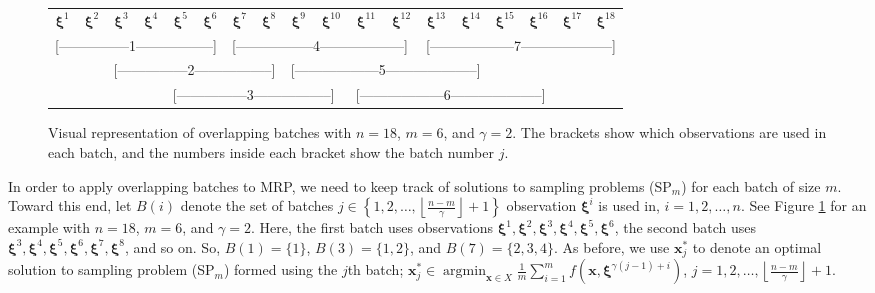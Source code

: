 \documentclass[12pt]{article}
\newcommand{\x}{\mathbf{x}}
\newcommand{\xs}{\x^*}
\newcommand{\xit}{\boldsymbol{\xi}}
\newcommand{\xiti}{\xit^i}
\newcommand{\nb}{\left\lfloor\tfrac{n-m}{\gamma}\right\rfloor+1}
\DeclareMathOperator*{\argmin}{argmin}
\begin{document}


\begin{figure}[tb!]
	\centering
	\begin{tabular}{*{18}{c}}
		$\xit^1$ & $\xit^2$ & $\xit^3$ & $\xit^4$ & $\xit^5$ & $\xit^6$ & $\xit^7$ & $\xit^8$ & $\xit^9$ & $\xit^{10}$ & $\xit^{11}$ & $\xit^{12}$ & $\xit^{13}$ & $\xit^{14}$ & $\xit^{15}$ & $\xit^{16}$ & $\xit^{17}$  & $\xit^{18}$ \\
		\multicolumn{6}{l}{[---------------1-----------------]} &
		\multicolumn{6}{l}{[-----------------4------------------]} &
		\multicolumn{6}{l}{[------------------7--------------------]} \\
		& & \multicolumn{6}{l}{[---------------2-----------------]} &
		\multicolumn{6}{l}{[------------------5--------------------]} \\
		& & & & \multicolumn{6}{l}{[---------------3-----------------]} &
		\multicolumn{6}{l}{[------------------6--------------------]} \\
	\end{tabular}
	\caption{Visual representation of overlapping batches with $n = 18$, $m = 6$, and $\gamma = 2$.  
        The brackets show which observations are used in each batch, and the numbers inside each bracket show the batch number $j$.}
	\label{fig:overlap_nonint}
\end{figure}

In order to apply overlapping batches to MRP, we need to keep track of solutions to sampling problems (SP$_m$) for each batch of size $m$.  
Toward this end, let $B(i)$ denote the set of batches $j \in \left\{1, 2, \dots, \nb \right\}$ observation $\xiti$ is used in, $i = 1, 2, \dots, n$.  
See Figure \ref{fig:overlap_nonint} for an example with $n=18$, $m = 6$, and $\gamma = 2$.  
Here, the first batch uses observations $\xit^1, \xit^2, \xit^3, \xit^4, \xit^5, \xit^6$, the second batch uses $\xit^3, \xit^4, \xit^5, \xit^6, \xit^7, \xit^8$, and so on.  
So, $B(1) = \{1\}$, $B(3) = \{1,2\}$, and $B(7)=\{2,3,4\}$.  
As before, we use $\xs_j$ to denote an optimal solution to sampling problem (SP$_m$) formed using the $j$th batch; $\xs_j \in \argmin_{\x \in X} \frac{1}{m} \sum_{i=1}^m f(\x,\xit^{\gamma(j-1) + i})$, $j = 1, 2, \dots, \nb$.
\end{document}
